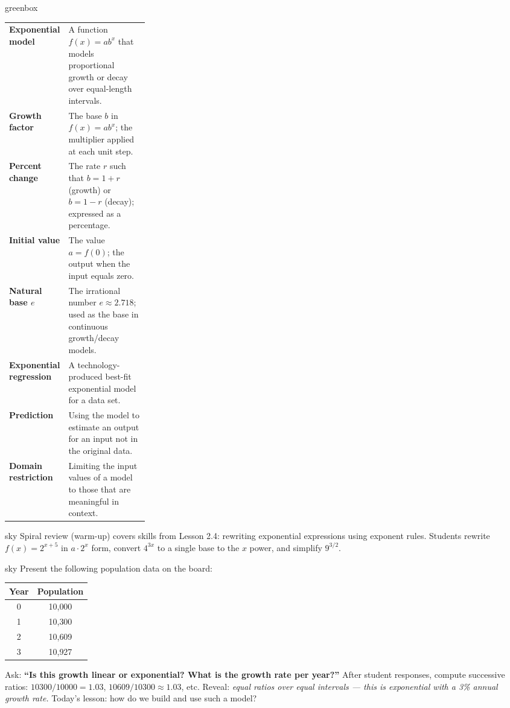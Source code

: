\documentclass[10pt]{article}
\begin{document}
\begin{skillbox}{greenbox}
\renewcommand{\arraystretch}{1.4}
\begin{tabularx}{\linewidth}{@{} >{\leavevmode\bfseries\color{navy}}p{0.27\linewidth} X @{}}
Exponential model      & A function $f(x) = ab^x$ that models proportional growth or decay over equal-length intervals. \\
Growth factor          & The base $b$ in $f(x) = ab^x$; the multiplier applied at each unit step. \\
Percent change         & The rate $r$ such that $b = 1+r$ (growth) or $b = 1-r$ (decay); expressed as a percentage. \\
Initial value          & The value $a = f(0)$; the output when the input equals zero. \\
Natural base $e$       & The irrational number $e \approx 2.718$; used as the base in continuous growth/decay models. \\
Exponential regression & A technology-produced best-fit exponential model for a data set. \\
Prediction             & Using the model to estimate an output for an input not in the original data. \\
Domain restriction     & Limiting the input values of a model to those that are meaningful in context. \\
\end{tabularx}
\end{skillbox}

\begin{skillbox}{sky}
    Spiral review (warm-up) covers skills from Lesson 2.4: rewriting exponential expressions
    using exponent rules. Students rewrite $f(x) = 2^{x+5}$ in $a \cdot 2^x$ form, convert
    $4^{3x}$ to a single base to the $x$ power, and simplify $9^{3/2}$.
\end{skillbox}

\begin{skillbox}[Hook]{sky}
Present the following population data on the board:

\medskip
\begin{center}
\begin{tabular}{c|c}
\textbf{Year} & \textbf{Population} \\ \hline
0 & 10{,}000 \\
1 & 10{,}300 \\
2 & 10{,}609 \\
3 & 10{,}927 \\
\end{tabular}
\end{center}

\medskip
Ask: \textbf{``Is this growth linear or exponential? What is the growth rate per year?''}
After student responses, compute successive ratios: $10300/10000 = 1.03$, $10609/10300 \approx 1.03$,
etc. Reveal: \textit{equal ratios over equal intervals --- this is exponential with a 3\% annual
growth rate.} Today's lesson: how do we build and use such a model?
\end{skillbox}
\end{document}
